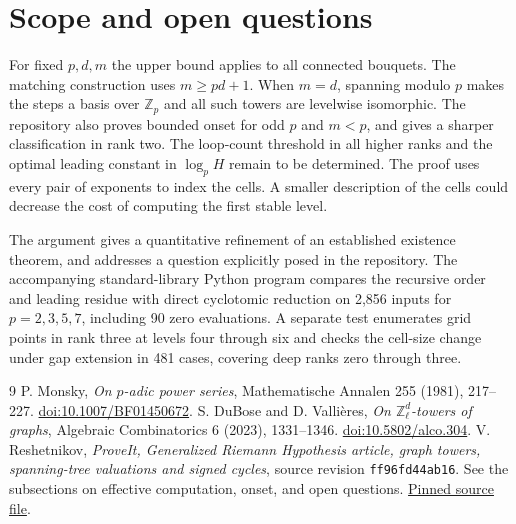 \documentclass[11pt]{article}
\newcommand{\Z}{\mathbb Z}
\begin{document}
\section{Scope and open questions}
For fixed $p,d,m$ the upper bound applies to all connected bouquets. The matching construction uses $m\ge pd+1$. When $m=d$, spanning modulo $p$ makes the steps a basis over $\Z_p$ and all such towers are levelwise isomorphic. The repository also proves bounded onset for odd $p$ and $m<p$, and gives a sharper classification in rank two. The loop-count threshold in all higher ranks and the optimal leading constant in $\log_p H$ remain to be determined. The proof uses every pair of exponents to index the cells. A smaller description of the cells could decrease the cost of computing the first stable level.

The argument gives a quantitative refinement of an established existence theorem, and addresses a question explicitly posed in the repository. The accompanying standard-library Python program compares the recursive order and leading residue with direct cyclotomic reduction on 2,856 inputs for $p=2,3,5,7$, including 90 zero evaluations. A separate test enumerates grid points in rank three at levels four through six and checks the cell-size change under gap extension in 481 cases, covering deep ranks zero through three.

\begin{thebibliography}{9}
 P. Monsky, \emph{On $p$-adic power series}, Mathematische Annalen 255 (1981), 217--227. \href{https://doi.org/10.1007/BF01450672}{doi:10.1007/BF01450672}.
 S. DuBose and D. Vallières, \emph{On $\mathbb Z_\ell^d$-towers of graphs}, Algebraic Combinatorics 6 (2023), 1331--1346. \href{https://doi.org/10.5802/alco.304}{doi:10.5802/alco.304}.
 V. Reshetnikov, \emph{ProveIt, Generalized Riemann Hypothesis article, graph towers, spanning-tree valuations and signed cycles}, source revision \texttt{ff96fd44ab16}. See the subsections on effective computation, onset, and open questions. \href{https://github.com/VladimirReshetnikov/ProveIt/blob/ff96fd44ab160e65fb8a9d861243828d07c156cf/Analysis/GeneralizedRiemannHypothesis/Article/sections/gra.tex}{Pinned source file}.
\end{thebibliography}
\end{document}
